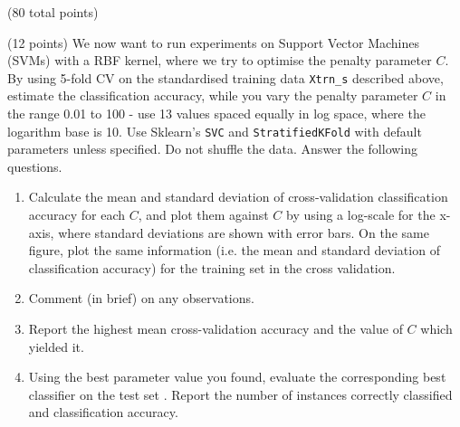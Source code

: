 \documentclass[12pt]{article}
\begin{document}
\begin{question}{(80 total points) \qOneTitle}
\begin{subquestion}{(12 points)
    We now want to run experiments on Support Vector Machines (SVMs) with a RBF kernel, where we try to optimise the penalty parameter $C$.
    By using 5-fold CV on the standardised training data {\tt Xtrn\_s} described above, estimate the classification accuracy, while you vary the penalty parameter $C$ in the range 0.01 to 100 - use 13 values spaced equally in log space, where the logarithm base is 10.
    Use Sklearn's {\tt SVC} and {\tt StratifiedKFold} with default parameters unless specified. Do not shuffle the data.
  } \label{q1:svm}
  Answer the following questions.
  \begin{enumerate}\NARROWITEM
  \item Calculate the mean and standard deviation of cross-validation classification accuracy for each $C$, and plot them against $C$ by using a log-scale for the x-axis, where standard deviations are shown with error bars.
    On the same figure, plot the same information (i.e. the mean and standard deviation of classification accuracy) for the training set in the cross validation.
  \item Comment (in brief) on any observations. 
  \item Report the highest mean cross-validation accuracy and the value of $C$ which yielded it.
  \item Using the best parameter value you found, evaluate the corresponding best classifier on the test set . Report the number of instances correctly classified and classification accuracy.
  \end{enumerate}
   


\end{subquestion}
\end{question}
\end{document}

